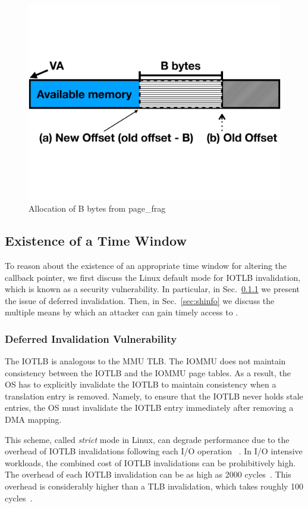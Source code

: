 \begin{figure}[t]
    \centering
    \includegraphics[width=0.65\linewidth,trim=0 6cm 0 6cm, clip]{figs/page_frag.pdf}
    \caption{Allocation of B bytes from page\_frag}
    \label{fig:page_frags}
\end{figure}

\subsection{Existence of a Time Window}\label{sec:timely}
To reason about the existence of an appropriate time window for altering the callback pointer, we first discuss the Linux default mode for IOTLB invalidation, which is known as a security vulnerability\cite{MMT16,MSMT18}.
In particular, in Sec.~\ref{sec:deferred} we present the issue of deferred invalidation. Then, in Sec.~\ref{sec:shinfo} we discuss the multiple means by which an attacker can gain timely access to \shinfo.

\subsubsection{Deferred Invalidation Vulnerability}\label{sec:deferred}
The IOTLB is analogous to the MMU TLB. The IOMMU does not maintain consistency between the IOTLB and the IOMMU page tables. As a result, the OS has to explicitly invalidate the IOTLB to maintain consistency when a translation entry is removed. Namely, to ensure that the IOTLB never holds stale entries, the OS must invalidate the IOTLB entry immediately after removing a DMA mapping. 

This scheme, called \emph{strict} mode in Linux, can degrade performance due to the overhead of IOTLB invalidations following each I/O operation ~\cite{MMT16,MSMT18,Peleg15}. In I/O intensive workloads, the combined cost of IOTLB invalidations can be prohibitively high. The overhead of each IOTLB invalidation can be as high as 2000 cycles~\cite{ABYTS11}. This overhead is considerably higher than a TLB invalidation, which takes roughly 100 cycles~\cite{Han14}. 

